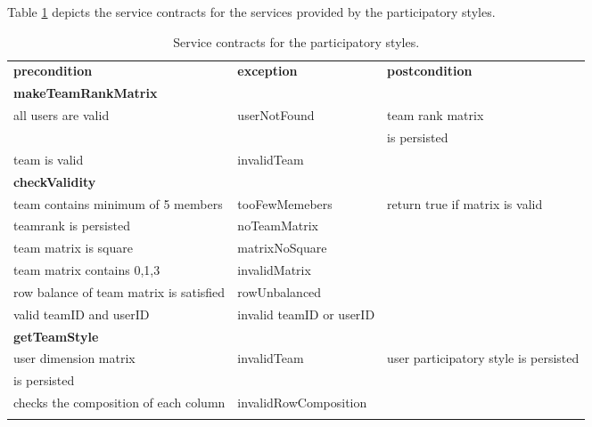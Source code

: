 Table \ref{tab:mbti_serviceContract} depicts the service contracts for the services provided by the participatory styles.

\begin{table}[htb]
\caption{Service contracts for the participatory styles. \label{tab:mbti_serviceContract}}

\begin{tabular}{l l l}
\hline
\noalign{\smallskip}
\textbf{precondition}&\textbf{exception} &\textbf{postcondition}\\
\noalign{\smallskip}
\hline
\noalign{\smallskip}
\textbf{makeTeamRankMatrix}\\
all users are valid & userNotFound & team rank matrix \\
&&is persisted \\team is valid & invalidTeam&\\
\noalign{\smallskip}
\textbf{checkValidity}\\
team contains minimum of 5 members & tooFewMemebers & return true if matrix is valid \\teamrank is persisted & noTeamMatrix &  \\team matrix is square&matrixNoSquare&\\team matrix contains 0,1,3& invalidMatrix&\\row balance of team matrix is satisfied& rowUnbalanced&\\valid teamID and userID&invalid teamID or userID&\\

\noalign{\smallskip}
\textbf{getTeamStyle}\\
user dimension matrix & invalidTeam & user participatory style is persisted\\
is persisted \\checks the composition of each column&invalidRowComposition&\\
\noalign{\smallskip}

\noalign{\smallskip}
\hline
\end{tabular}  
\end{table}
 